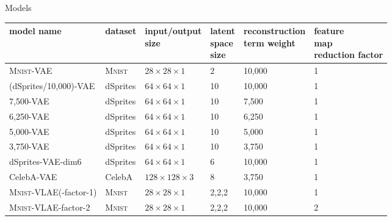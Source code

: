 \documentclass{beamer}
\begin{document}
\begin{frame}{Models}
\fontsize{6pt}{7.2}\selectfont
\begin{table}[H]
\centering
\begin{tabularx}{\textwidth}{lXXXXX}
\toprule
model name              & dataset        & \parbox[t]{1cm}{\fontsize{6pt}{7.2}\raggedleft input/output\\size}       & \parbox[t]{1cm}{\fontsize{6pt}{7.2}\raggedleft latent\\space\\size} & \parbox[t]{1cm}{\fontsize{6pt}{7.2}\raggedleft reconstruction\\term weight} & \parbox[t]{1cm}{\fontsize{6pt}{7.2}\raggedleft feature\\map\\reduction factor} \\
\midrule
\textsc{Mnist}-VAE & \textsc{Mnist} & $28\times 28\times 1$   & 2                 & 10,000                     & 1                            \\
(dSprites/10,000)-VAE       & dSprites       & $64\times 64\times 1$   & 10                & 10,000                     & 1                            \\
7,500-VAE          & dSprites       & $64\times 64\times 1$   & 10                & 7,500                      & 1                            \\
6,250-VAE          & dSprites       & $64\times 64\times 1$   & 10                & 6,250                      & 1                            \\
5,000-VAE          & dSprites       & $64\times 64\times 1$   & 10                & 5,000                      & 1                            \\
3,750-VAE          & dSprites       & $64\times 64\times 1$   & 10                & 3,750                      & 1                            \\
dSprites-VAE-dim6  & dSprites       & $64\times 64\times 1$   & 6                 & 10,000                     & 1                            \\
CelebA-VAE         & CelebA         & $128\times 128\times 3$ & 8                 & 3,750                      & 1                            \\
\midrule
\textsc{Mnist}-VLAE(-factor-1) & \textsc{Mnist} & $28\times 28\times 1$ & 2,2,2 & 10,000 & 1 \\
\textsc{Mnist}-VLAE-factor-2 & \textsc{Mnist} & $28\times 28\times 1$ & 2,2,2 & 10,000 & 2 \\

\end{tabularx}
\end{table}
\end{frame}
\end{document}
